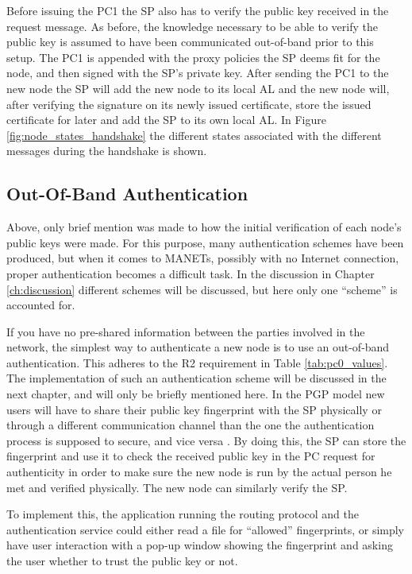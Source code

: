 Before issuing the \ac{PC1} the \ac{SP} also has to verify the public key
received in the request message. As before, the knowledge necessary to be able
to verify the public key is assumed to have been communicated out-of-band prior
to this setup. The \ac{PC1} is appended with the proxy policies the \ac{SP}
deems fit for the node, and then signed with the \ac{SP}'s private key. After
sending the \ac{PC1} to the new node the \ac{SP} will add the new node to its
local \ac{AL} and the new node will, after verifying the signature on its newly
issued certificate, store the issued certificate for later and add the \ac{SP}
to its own local \ac{AL}. In Figure \ref{fig:node_states_handshake} the
different states associated with the different messages during the handshake is
shown.

\subsection{Out-Of-Band Authentication}
Above, only brief mention was made to how the initial verification of each
node's public keys were made. For this purpose, many authentication schemes
have been produced, but when it comes to \acp{MANET}, possibly with no Internet
connection, proper authentication becomes a difficult task. In the discussion
in Chapter \ref{ch:discussion} different schemes will be discussed, but here
only one ``scheme'' is accounted for.

If you have no pre-shared information between the parties involved in the
network, the simplest way to authenticate a new node is to use an out-of-band
authentication. This adheres to the R2 requirement in Table
\ref{tab:pc0_values}. The implementation of such an authentication scheme will
be discussed in the next chapter, and will only be briefly mentioned here. In
the PGP model new users will have to share their public key fingerprint with the
\ac{SP} physically or through a different communication channel than the one
the authentication process is supposed to secure, and vice versa
\cite{zimmermann1995official}. By doing this, the \ac{SP} can store the
fingerprint and use it to check the received public key in the \ac{PC} request
for authenticity in order to make sure the new node is run by the actual person
he met and verified physically. The new node can similarly verify the \ac{SP}.

To implement this, the application running the routing protocol and the
authentication service could either read a file for ``allowed'' fingerprints, or
simply have user interaction with a pop-up window showing the fingerprint and
asking the user whether to trust the public key or not.

